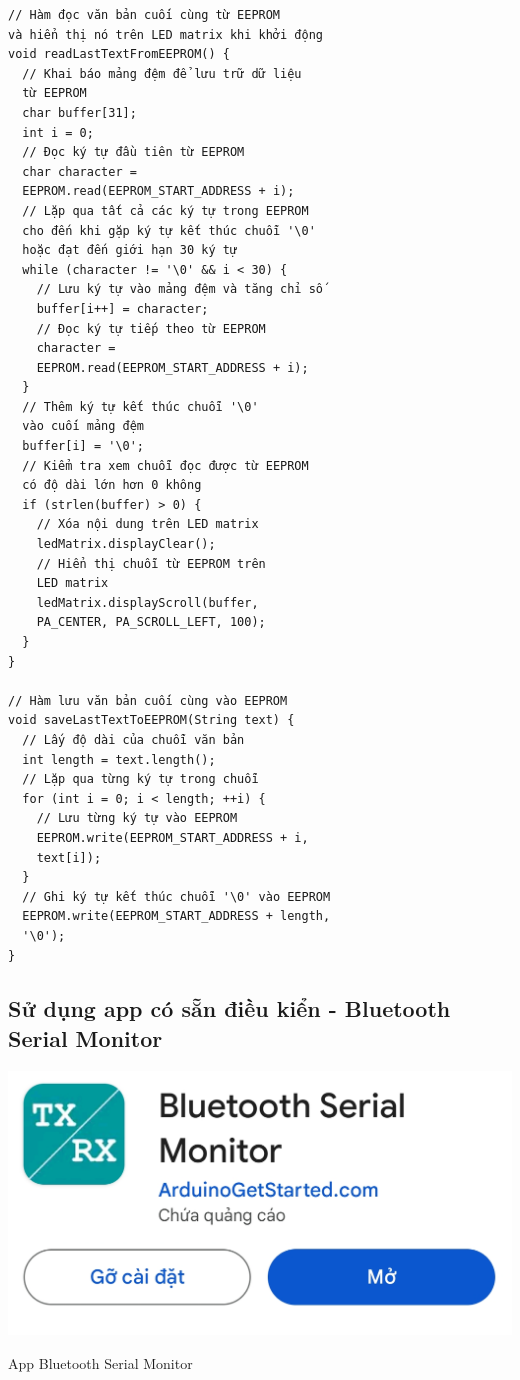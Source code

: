 \documentclass[conference]{IEEEtran}
\begin{document}
\begin{verbatim}
// Hàm đọc văn bản cuối cùng từ EEPROM 
và hiển thị nó trên LED matrix khi khởi động
void readLastTextFromEEPROM() {
  // Khai báo mảng đệm để lưu trữ dữ liệu 
  từ EEPROM
  char buffer[31];                        
  int i = 0;
  // Đọc ký tự đầu tiên từ EEPROM
  char character = 
  EEPROM.read(EEPROM_START_ADDRESS + i);  
  // Lặp qua tất cả các ký tự trong EEPROM 
  cho đến khi gặp ký tự kết thúc chuỗi '\0' 
  hoặc đạt đến giới hạn 30 ký tự
  while (character != '\0' && i < 30) {   
    // Lưu ký tự vào mảng đệm và tăng chỉ số
    buffer[i++] = character;              
    // Đọc ký tự tiếp theo từ EEPROM
    character = 
    EEPROM.read(EEPROM_START_ADDRESS + i);  
  }
  // Thêm ký tự kết thúc chuỗi '\0' 
  vào cuối mảng đệm
  buffer[i] = '\0';                       
  // Kiểm tra xem chuỗi đọc được từ EEPROM 
  có độ dài lớn hơn 0 không
  if (strlen(buffer) > 0) {               
    // Xóa nội dung trên LED matrix
    ledMatrix.displayClear();             
    // Hiển thị chuỗi từ EEPROM trên 
    LED matrix
    ledMatrix.displayScroll(buffer, 
    PA_CENTER, PA_SCROLL_LEFT, 100);  
  }
}

// Hàm lưu văn bản cuối cùng vào EEPROM
void saveLastTextToEEPROM(String text) {
  // Lấy độ dài của chuỗi văn bản
  int length = text.length();             
  // Lặp qua từng ký tự trong chuỗi
  for (int i = 0; i < length; ++i) {      
    // Lưu từng ký tự vào EEPROM
    EEPROM.write(EEPROM_START_ADDRESS + i, 
    text[i]);  
  }
  // Ghi ký tự kết thúc chuỗi '\0' vào EEPROM
  EEPROM.write(EEPROM_START_ADDRESS + length, 
  '\0');  
}
\end{verbatim}
\subsection{Sử dụng app có sẵn điều kiển - Bluetooth Serial Monitor}\label{SCM}
    \centering
    \includegraphics[width=1\linewidth]{App.jpg}
    \caption{App Bluetooth Serial Monitor}
    \label{fig:enter-label}
\end{document}
